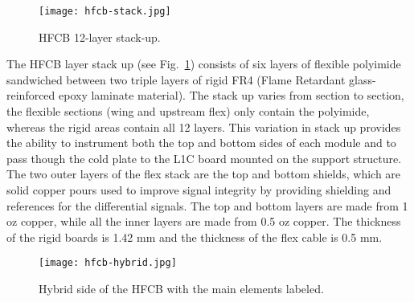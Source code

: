 \begin{figure}[h] 
\centering 
\texttt{[image: hfcb-stack.jpg]}
\caption{HFCB 12-layer stack-up.}
\label{fig:hfcb-stack}
\end{figure}

The HFCB layer stack up (see Fig.~\ref{fig:hfcb-stack}) consists of six layers of flexible polyimide sandwiched between two triple layers of rigid FR4 (Flame Retardant glass-reinforced epoxy laminate material). The stack up varies from section to section, the flexible sections (wing and upstream flex) only contain the polyimide, whereas the rigid areas contain all 12 layers. This variation in stack up provides the ability to instrument both the top and bottom sides of each module and to pass though the cold plate to the L1C board mounted on the support structure. The two outer layers of the flex stack are the top and bottom shields, which are solid copper pours used to improve signal integrity by providing shielding and references for the differential signals. The top and bottom layers are made from 1 oz copper, while all the inner layers are made from 0.5 oz copper. The thickness of the rigid boards is 1.42 mm and the thickness of the flex cable is 0.5 mm.

\begin{figure}[h] 
\centering 
\texttt{[image: hfcb-hybrid.jpg]}
\caption{Hybrid side of the HFCB with the main elements labeled.}
\label{fig:hfcb-hybrid}
\end{figure}

